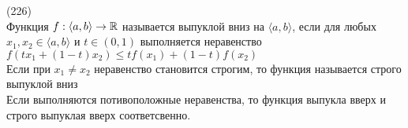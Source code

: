 (226)\\
Функция $f: \langle a, b\rangle \to \mathbb{R}$ называется выпуклой вниз на $\langle a, b\rangle$, если для любых $x_1, x_2 \in \langle a, b\rangle $ и $t \in (0, 1)$ выполняется неравенство\\
$f(tx_1 + (1 - t)x_2) \le tf(x_1) + (1 - t)f(x_2)$\\
Если при $x_1 \neq x_2$ неравенство становится строгим, то функция называется строго выпуклой вниз\\
Если выполняются потивоположные неравенства, то функция выпукла вверх и строго выпуклая вверх соответсвенно.
